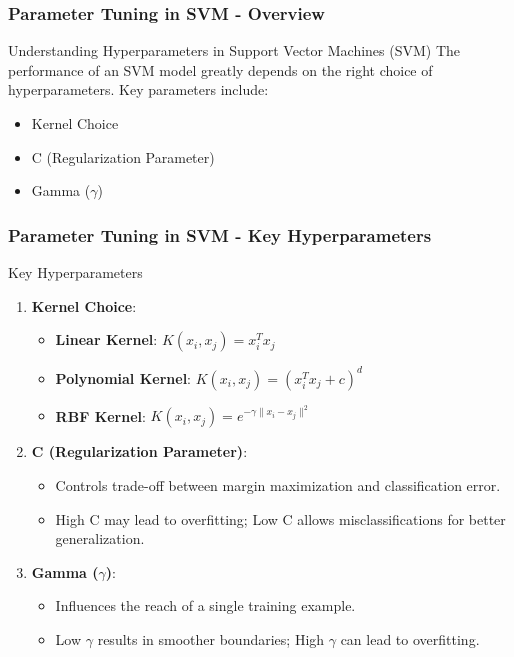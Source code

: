 \documentclass{beamer}
\begin{document}
\begin{frame}[fragile]
    \frametitle{Parameter Tuning in SVM - Overview}
    \begin{block}{Understanding Hyperparameters in Support Vector Machines (SVM)}
        The performance of an SVM model greatly depends on the right choice of hyperparameters. Key parameters include:
    \end{block}
    \begin{itemize}
        \item Kernel Choice
        \item C (Regularization Parameter)
        \item Gamma ($\gamma$)
    \end{itemize}
\end{frame}

\begin{frame}[fragile]
    \frametitle{Parameter Tuning in SVM - Key Hyperparameters}
    \begin{block}{Key Hyperparameters}
        \begin{enumerate}
            \item \textbf{Kernel Choice}:
                \begin{itemize}
                    \item \textbf{Linear Kernel}: \( K(x_i, x_j) = x_i^T x_j \) 
                    \item \textbf{Polynomial Kernel}: \( K(x_i, x_j) = (x_i^T x_j + c)^d \)
                    \item \textbf{RBF Kernel}: \( K(x_i, x_j) = e^{-\gamma \|x_i - x_j\|^2} \)
                \end{itemize}
            \item \textbf{C (Regularization Parameter)}:
                \begin{itemize}
                    \item Controls trade-off between margin maximization and classification error.
                    \item High C may lead to overfitting; Low C allows misclassifications for better generalization.
                \end{itemize}
            \item \textbf{Gamma ($\gamma$)}:
                \begin{itemize}
                    \item Influences the reach of a single training example.
                    \item Low $\gamma$ results in smoother boundaries; High $\gamma$ can lead to overfitting.
                \end{itemize}
        \end{enumerate}
    \end{block}
\end{frame}
\end{document}
